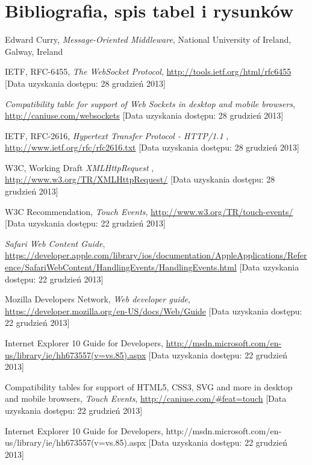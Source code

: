 \section{Bibliografia, spis tabel i rysunków}

\begin{thebibliography}{1}
	
   Edward Curry, \emph{Message-Oriented Middleware}, National University of Ireland, Galway, Ireland

   IETF, RFC-6455, \emph{The WebSocket Protocol}, \url{http://tools.ietf.org/html/rfc6455} [Data uzyskania dostępu: 28 grudzień 2013]

   \emph{Compatibility table for support of Web Sockets in desktop and mobile browsers}, \url{http://caniuse.com/websockets} [Data uzyskania dostępu: 28 grudzień 2013]

   IETF, RFC-2616, \emph{Hypertext Transfer Protocol - HTTP/1.1} , \url{http://www.ietf.org/rfc/rfc2616.txt} [Data uzyskania dostępu: 28 grudzień 2013]

   W3C, Working Draft \emph{XMLHttpRequest} , \url{http://www.w3.org/TR/XMLHttpRequest/} [Data uzyskania dostępu: 28 grudzień 2013]

   W3C Recommendation, {\em Touch Events}, \url{http://www.w3.org/TR/touch-events/} [Data uzyskania dostępu: 22 grudzień 2013]
  
   {\em Safari Web Content Guide}, \url{https://developer.apple.com/library/ios/documentation/AppleApplications/Reference/SafariWebContent/HandlingEvents/HandlingEvents.html} [Data uzyskania dostępu: 22 grudzień 2013]
  
   Mozilla Developers Network, {\em Web developer guide}, \url{https://developer.mozilla.org/en-US/docs/Web/Guide} [Data uzyskania dostępu: 22 grudzień 2013]
  
   Internet Explorer 10 Guide for Developers, \url{http://msdn.microsoft.com/en-us/library/ie/hh673557(v=vs.85).aspx} [Data uzyskania dostępu: 22 grudzień 2013]
  
   Compatibility tables for support of HTML5, CSS3, SVG and more in desktop and mobile browsers, {\em Touch Events}, \url{http://caniuse.com/\#feat=touch} [Data uzyskania dostępu: 22 grudzień 2013]
  
   Internet Explorer 10 Guide for Developers, http://msdn.microsoft.com/en-us/library/ie/hh673557(v=vs.85).aspx [Data uzyskania dostępu: 22 grudzień 2013]
  

\end{thebibliography}
